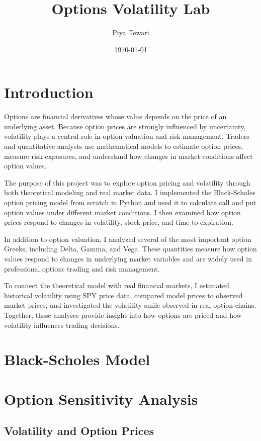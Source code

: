 \documentclass[11pt]{article}
\title{Options Volatility Lab}
\author{Piya Tewari}
\date{\today}
\begin{document}
\maketitle

\section{Introduction}

Options are financial derivatives whose value depends on the price of an underlying asset. Because option prices are strongly influenced by uncertainty, volatility plays a central role in option valuation and risk management. Traders and quantitative analysts use mathematical models to estimate option prices, measure risk exposures, and understand how changes in market conditions affect option values.

The purpose of this project was to explore option pricing and volatility through both theoretical modeling and real market data. I implemented the Black-Scholes option pricing model from scratch in Python and used it to calculate call and put option values under different market conditions. I then examined how option prices respond to changes in volatility, stock price, and time to expiration.

In addition to option valuation, I analyzed several of the most important option Greeks, including Delta, Gamma, and Vega. These quantities measure how option values respond to changes in underlying market variables and are widely used in professional options trading and risk management.

To connect the theoretical model with real financial markets, I estimated historical volatility using SPY price data, compared model prices to observed market prices, and investigated the volatility smile observed in real option chains. Together, these analyses provide insight into how options are priced and how volatility influences trading decisions.

\section{Black-Scholes Model}

\section{Option Sensitivity Analysis}

\subsection{Volatility and Option Prices}
\end{document}
